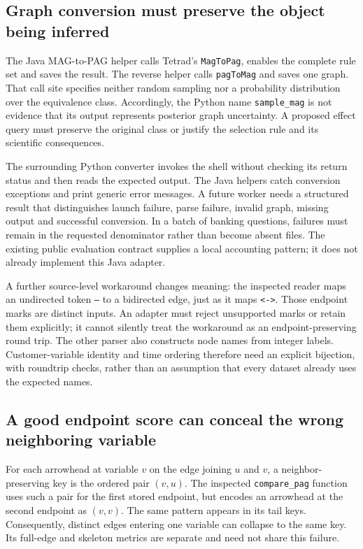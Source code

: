 \subsection{Graph conversion must preserve the object being inferred}
The Java MAG-to-PAG helper calls Tetrad's \texttt{MagToPag}, enables the complete
rule set and saves the result. The reverse helper calls \texttt{pagToMag} and
saves one graph. That call site specifies neither random sampling nor a
probability distribution over the equivalence class. Accordingly, the Python
name \texttt{sample\_mag} is not evidence that its output represents posterior
graph uncertainty. A proposed effect query must preserve the original class
or justify the selection rule and its scientific consequences.
\citep{exec28_nested_sources}

The surrounding Python converter invokes the shell without checking its return
status and then reads the expected output. The Java helpers catch conversion
exceptions and print generic error messages. A future worker needs a structured
result that distinguishes launch failure, parse failure, invalid graph, missing
output and successful conversion. In a batch of banking questions, failures
must remain in the requested denominator rather than become absent files.
The existing public evaluation contract supplies a local accounting pattern;
it does not already implement this Java adapter.~\citep{exec28_nested_sources,exec28_fj_contract}

A further source-level workaround changes meaning: the inspected reader maps
an undirected token \texttt{---} to a bidirected edge, just as it maps
\texttt{<->}. Those endpoint marks are distinct inputs. An adapter must reject
unsupported marks or retain them explicitly; it cannot silently treat the
workaround as an endpoint-preserving round trip. The other parser also
constructs node names from integer labels. Customer-variable identity and
time ordering therefore need an explicit bijection, with roundtrip checks,
rather than an assumption that every dataset already uses the expected names.
\citep{exec28_nested_sources}

\subsection{A good endpoint score can conceal the wrong neighboring variable}
For each arrowhead at variable $v$ on the edge joining $u$ and $v$, a
neighbor-preserving key is the ordered pair $(v,u)$. The inspected
\texttt{compare\_pag} function uses such a pair for the first stored endpoint,
but encodes an arrowhead at the second endpoint as $(v,v)$. The same pattern
appears in its tail keys. Consequently, distinct edges entering one variable
can collapse to the same key. Its full-edge and skeleton metrics are separate
and need not share this failure.~\citep{exec28_nested_sources}

